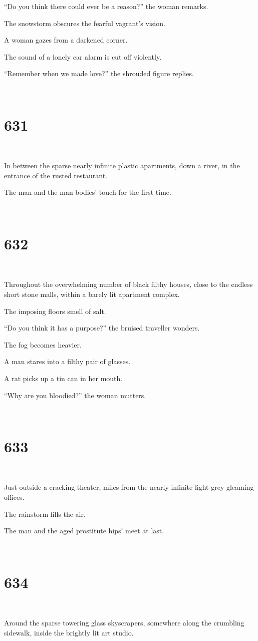 \documentclass{report}
\begin{document}
``Do you think there could ever be a reason?'' the woman remarks.

The snowstorm obscures the fearful vagrant's vision.

A woman gazes from a darkened corner.

The sound of a lonely car alarm is cut off violently.

``Remember when we made love?'' the shrouded figure replies.

~
\chapter*{631}
~

In between the sparse nearly infinite plastic apartments, down a river, in the entrance of the rusted restaurant.

The man and the man bodies' touch for the first time.

~
\chapter*{632}
~

Throughout the overwhelming number of black filthy houses, close to the endless short stone malls, within a barely lit apartment complex.

The imposing floors smell of salt.

``Do you think it has a purpose?'' the bruised traveller wonders.

The fog becomes heavier.

A man stares into a filthy pair of glasses.

A rat picks up a tin can in her mouth.

``Why are you bloodied?'' the woman mutters.

~
\chapter*{633}
~

Just outside a cracking theater, miles from the nearly infinite light grey gleaming offices.

The rainstorm fills the air.

The man and the aged prostitute hips' meet at last.

~
\chapter*{634}
~

Around the sparse towering glass skyscrapers, somewhere along the crumbling sidewalk, inside the brightly lit art studio.
\end{document}

